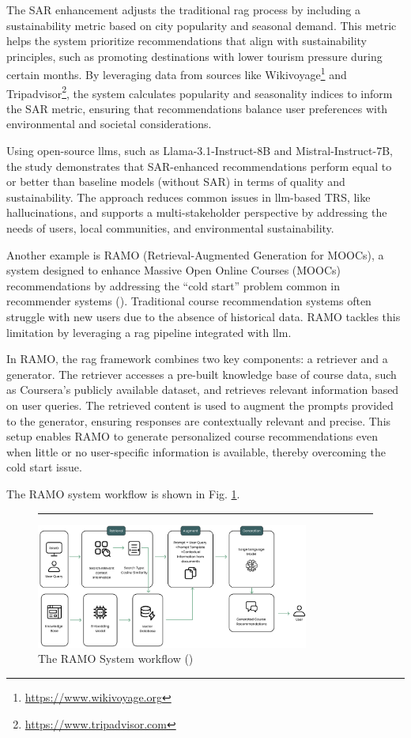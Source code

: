 The SAR enhancement adjusts the traditional \gls{rag} process by including a sustainability metric based on city popularity and seasonal demand.
This metric helps the system prioritize recommendations that align with sustainability principles, such as promoting destinations with lower tourism pressure during certain months.
By leveraging data from sources like Wikivoyage\footnote{\url{https://www.wikivoyage.org}} and Tripadvisor\footnote{\url{https://www.tripadvisor.com}}, the system calculates popularity and seasonality indices to inform the SAR metric, ensuring that recommendations balance user preferences with environmental and societal considerations.

Using open-source \glspl{llm}, such as Llama-3.1-Instruct-8B and Mistral-Instruct-7B, the study demonstrates that SAR-enhanced recommendations perform equal to or better than baseline models (without SAR) in terms of quality and sustainability.
The approach reduces common issues in \gls{llm}-based TRS, like hallucinations, and supports a multi-stakeholder perspective by addressing the needs of users, local communities, and environmental sustainability.

Another example is RAMO (Retrieval-Augmented Generation for MOOCs), a system designed to enhance Massive Open Online Courses (MOOCs) recommendations by addressing the ``cold start'' problem common in recommender systems (\cite{Rao2024}).
Traditional course recommendation systems often struggle with new users due to the absence of historical data.
RAMO tackles this limitation by leveraging a \gls{rag} pipeline integrated with \gls{llm}.

In RAMO, the \gls{rag} framework combines two key components: a retriever and a generator.
The retriever accesses a pre-built knowledge base of course data, such as Coursera's publicly available dataset, and retrieves relevant information based on user queries.
The retrieved content is used to augment the prompts provided to the generator, ensuring responses are contextually relevant and precise.
This setup enables RAMO to generate personalized course recommendations even when little or no user-specific information is available, thereby overcoming the cold start issue.

The RAMO system workflow is shown in Fig. \ref{fig:ramo-system-workflow}.

\begin{figure}[htbp]
    \centering
    \rule{35em}{0.5pt}
    \includegraphics[width=0.8\textwidth]{03_Figures/literature-review/ramo.png}
    \caption{The RAMO System workflow (\cite{Rao2024})}
 \label{fig:ramo-system-workflow}
\end{figure}


